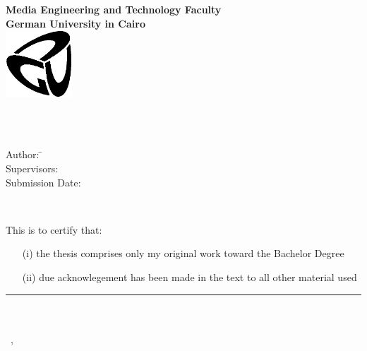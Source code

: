 \newcommand{\titlePage}{

\thispagestyle{empty}
\begin{center}
  \textbf{Media Engineering and Technology Faculty}\\[1mm]
  \textbf{German University in Cairo}\\[1mm]
  \includegraphics[width=2.5cm]{graphics/GUC-logo-ss.eps}
  
  \vspace{2cm}
  \doublespacing
  {\Huge \textbf{\titleOfThesisOne}}\\
  \singlespacing
  \vspace{2cm}
  {\large \textbf{\typeOfThesis}}\\
  
  \vfill
  \parbox{1cm}{
      \begin{large}
          \begin{tabbing}
            Author: \hspace{2cm}  
              \=\authorOfThesis\\[2mm]
            Supervisors: 
              \>\supervisorOne\\[2mm]
            Submission Date: 
              \>\submissionDate\\
          \end{tabbing}
      \end{large}
  }\\
\end{center}
\clearpage
}
\titlePage
\thispagestyle{empty}
This is to certify that:
\begin{itemize}
\item[(i)] the thesis comprises only my original work toward the Bachelor Degree
\item[(ii)] due acknowlegement has been made in the text to all other material used
\end{itemize}

\vspace{2cm}
\begin{flushright}
\rule[0mm]{6cm}{0.2mm}\\
\authorOfThesis\\
\submissionDay~\submissionMonth,~\submissionYear\\
\end{flushright}
\clearpage
